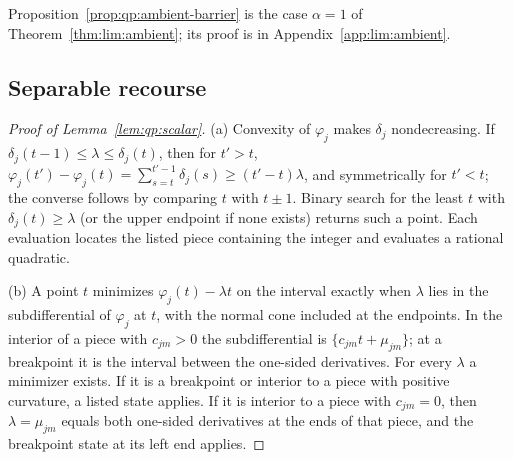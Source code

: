 Proposition~\ref{prop:qp:ambient-barrier} is the case $\alpha=1$ of
Theorem~\ref{thm:lim:ambient}; its proof is in Appendix~\ref{app:lim:ambient}.

\subsection{Separable recourse}\label{app:qp:sep}

\begin{proof}[Proof of Lemma~\ref{lem:qp:scalar}]
(a) Convexity of $\varphi_j$ makes $\delta_j$ nondecreasing. If
$\delta_j(t-1)\le\lambda\le\delta_j(t)$, then for $t'>t$,
$\varphi_j(t')-\varphi_j(t)=\sum_{s=t}^{t'-1}\delta_j(s)\ge(t'-t)\lambda$, and
symmetrically for $t'<t$; the converse follows by comparing $t$ with $t\pm1$.
Binary search for the least $t$ with $\delta_j(t)\ge\lambda$ (or the upper
endpoint if none exists) returns such a point. Each evaluation locates the
listed piece containing the integer and evaluates a rational quadratic.

(b) A point $t$ minimizes $\varphi_j(t)-\lambda t$ on the interval exactly
when $\lambda$ lies in the subdifferential of $\varphi_j$ at $t$, with the
normal cone included at the endpoints. In the interior of a piece with
$c_{jm}>0$ the subdifferential is $\{c_{jm}t+\mu_{jm}\}$; at a
breakpoint it is the interval between the one-sided derivatives. For every
$\lambda$ a minimizer exists. If it is a breakpoint or interior to a piece
with positive curvature, a listed state applies. If it is interior to a piece
with $c_{jm}=0$, then $\lambda=\mu_{jm}$ equals both one-sided derivatives at
the ends of that piece, and the breakpoint state at its left end applies.
\end{proof}

